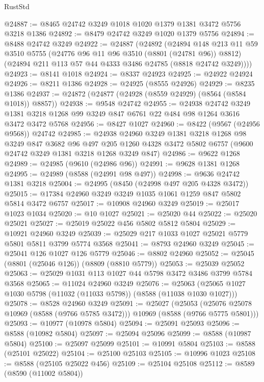 \begin{lexlean}{RustStd}
\begin{coremodule}
@24887 := @8465 @24742 @3249 @1018 @1020 @1379 @1381 @3472 @5756 @3218 @1386
@24892 := @8479 @24742 @3249 @1020 @1379 @5756
@24894 := @8488 @24742 @3249
@24922 := @24887
    (@24892
      (@24894
        @148
        @213
        @11
        @59
        @3510
        @5755
        (@24776 @96 @11 @96 @3510 (@8801 (@24781 @96)) @8812)
        (@24894 @211 @113 @57 @44 @4333 @3486 @24785 (@8818 @24742 @3249))))
@24923 := @8141 @1018
@24924 := @8337 @24923
@24925 := @24922 @24924
@24926 := @8211 @1386
@24928 := @24925 (@8555 @24926)
@24929 := @8235 @1386
@24937 := @24872 (@24877 (@24928 (@8559 @24929) (@8564 (@8584 @1018)) @8857))
@24938 := @9548 @24742
@24955 := @24938
    @24742
    @3249
    @1381
    @3218
    @1268
    @99
    @3249
    @847
    @6761
    @22
    @484
    @98
    @1264
    @3616
    @3472
    @3472
    @5768
@24956 := @8427 @1027
@24960 := @8422 (@9567 (@24956 @9568)) @24742
@24985 := @24938
    @24960
    @3249
    @1381
    @3218
    @1268
    @98
    @3249
    @847
    @3682
    @96
    @497
    @205
    @1260
    @4328
    @3472
    @5802
    @6757
    (@9600 @24742 @3249 @1381 @3218 @1268 @3249 @847)
@24986 := @9622 @1268
@24989 := @24985 (@9610 (@24986 @96))
@24991 := @9628 @1381 @1268
@24995 := @24989 (@8588 (@24991 @98 @497))
@24998 := @9636 @24742 @1381 @3218
@25004 := @24995 (@8450 (@24998 @497 @205 @4328 @3472))
@25015 := @17384 @24960 @3249 @3249 @1035 @1061 @1259 @847 @5802 @5814 @3472 @6757
@25017 := @10908 @24960 @3249
@25019 := @25017 @1023 @1034
@25020 := @10 @1027
@25021 := @25020 @44
@25022 := @25020 @25021
@25027 := @25019 @25022 @456 @5802 @5812 @5804
@25029 := @10921 @24960 @3249
@25039 := @25029 @217 @1033 @1027 @25021 @5779 @5801 @5811 @3799 @5774 @3568
@25041 := @8793 @24960 @3249
@25045 := @25041 @126 @1027 @126 @5779
@25046 := @8802 @24960
@25052 := @25045 (@8801 (@25046 @126)) (@8809 (@8810 @5779))
@25053 := @25039 @25052
@25063 := @25029 @1031 @113 @1027 @44 @5798 @3472 @3486 @3799 @5784 @3568
@25065 := @11024 @24960 @3249
@25076 := @25063 (@25065 @1027 @1030 @5798 (@11032 (@11033 @5798)) (@8588 (@11038 @1030 @1027)))
@25078 := @8528 @24960 @3249
@25091 := @25027
    (@25053 (@25076 @25078 @10969 (@8588 (@9766 @5785 @3472))) @10969 (@8588 (@9766 @5775 @5801)))
@25093 := @10977 (@10978 @5804)
@25094 := @25091 @25093
@25096 := @8588 (@10982 @5804)
@25097 := @25094 @25096
@25099 := @8588 (@10987 @5804)
@25100 := @25097 @25099
@25101 := @10991 @5804
@25103 := @8588 (@25101 @25022)
@25104 := @25100 @25103
@25105 := @10996 @1023
@25108 := @8588 (@25105 @25022 @456)
@25109 := @25104 @25108
@25112 := @8589 (@8590 (@11002 @5804))

\end{coremodule}
\end{lexlean}
